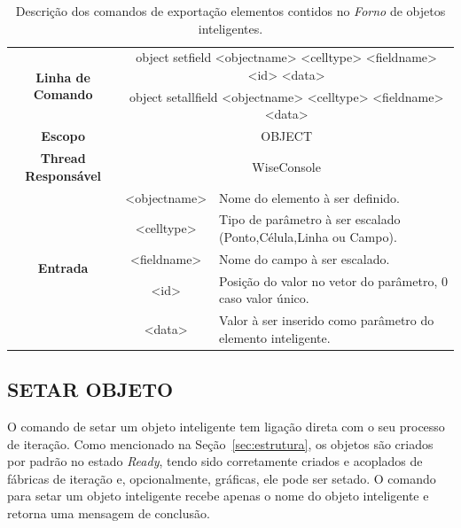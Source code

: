 \begin{center}
	\begin{table}[!htbp]
		\begin{tabular}{|c|c|m{}|}
			\hline
			\multirow{2}{*}{\textbf{Linha de Comando}} & \multicolumn{2}{c|}{object set\underline{\space\space}field <object\underline{\space\space}name> <cell\underline{\space\space}type> <field\underline{\space\space}name> <id> <data>} \\
			& \multicolumn{2}{c|}{object set\underline{\space\space}all\underline{\space\space}field <object\underline{\space\space}name> <cell\underline{\space\space}type> <field\underline{\space\space}name> <data>} \\
			\hline
			\textbf{Escopo} & \multicolumn{2}{c|}{OBJECT} \\
			\hline
			\textbf{Thread Responsável} & \multicolumn{2}{c|}{WiseConsole} \\
			\hline
			\multirow{5}{*}{\textbf{Entrada}} & <object\underline{\space\space}name> & Nome do elemento à ser definido. \\
			& <cell\underline{\space\space}type> & Tipo de parâmetro à ser escalado (Ponto,Célula,Linha ou Campo). \\
			& <field\underline{\space\space}name> & Nome do campo à ser escalado. \\
			& <id> & Posição do valor no vetor do parâmetro, 0 caso valor único. \\
			& <data> & Valor à ser inserido como parâmetro do elemento inteligente. \\
			\hline
		\end{tabular}
		\caption{Descrição dos comandos de exportação elementos contidos no \textit{Forno} de objetos inteligentes.}
		\label{tab:set_field_object}
	\end{table}
\end{center}

\subsection{SETAR OBJETO}\label{sec:set_object}

O comando de setar um objeto inteligente tem ligação direta com o seu processo de iteração. Como mencionado na Seção~\ref{sec:estrutura}, os objetos são criados por padrão no estado \textit{Ready}, tendo sido corretamente criados e acoplados de fábricas de iteração e, opcionalmente, gráficas, ele pode ser setado. O comando para setar um objeto inteligente recebe apenas o nome do objeto inteligente e retorna uma mensagem de conclusão.

